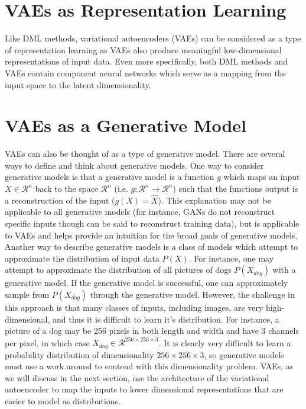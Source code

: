 \documentclass[./dissertation.tex]{subfiles}
\begin{document}

    \section{VAEs as Representation Learning}
    Like DML methods, variational autoencoders (VAEs) can be considered as a type of representation learning as VAEs also produce meaningful low-dimensional representations of input data. Even more specifically, both DML methods and VAEs contain component neural networks which serve as a mapping from the input space to the latent dimensionality. 
    
    \section{VAEs as a Generative Model}
    VAEs can also be thought of as a type of generative model. There are several ways to define and think about generative models. One way to consider generative models is that a generative model is a function $g$ which maps an input $X \in \mathcal{R}^{n}$ back to the space $\mathcal{R}^{n}$ (i.e. $g: \mathcal{R}^{n} \to \mathcal{R}^{n}$) such that the functions output is a reconstruction of the input ($g(X) = \hat{X}$). This explanation may not be applicable to all generative models (for instance, GANs do not reconstruct specific inputs though can be said to reconstruct training data), but is applicable to VAEs and helps provide an intuition for the broad goals of generative models.  \\
    
    Another way to describe generative models is a class of models which attempt to approximate the distribution of input data $P(X)$. For instance, one may attempt to approximate the distribution of all pictures of dogs $P(X_{dog})$ with a generative model. If the generative model is successful, one can approximately sample from $P(X_{dog})$ through the generative model. However, the challenge in this approach is that many classes of inputs, including images, are very high-dimensional, and thus it is difficult to learn it's distribution. For instance, a picture of a dog may be 256 pixels in both length and width and have 3 channels per pixel, in which case $X_{dog} \in \mathcal{R}^{256 \times 256 \times 3}$. It is clearly very difficult to learn a probability distribution of dimensionality ${256 \times 256 \times 3}$, so generative models must use a work around to contend with this dimensionality problem. VAEs, as we will discuss in the next section, use the architecture of the variational autoencoder to map the inputs to lower dimensional representations that are easier to model as distributions. 
    
\end{document}
